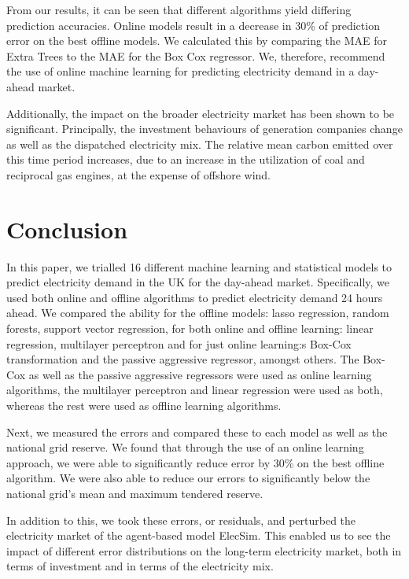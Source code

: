 \documentclass[final,3p,times,twocolumn,numbers]{elsarticle}
\begin{document}

From our results, it can be seen that different algorithms yield differing prediction accuracies. Online models result in a decrease in 30\% of prediction error on the best offline models. We calculated this by comparing the MAE for Extra Trees to the MAE for the Box Cox regressor. We, therefore, recommend the use of online machine learning for predicting electricity demand in a day-ahead market.

Additionally, the impact on the broader electricity market has been shown to be significant. Principally, the investment behaviours of generation companies change as well as the dispatched electricity mix. The relative mean carbon emitted over this time period increases, due to an increase in the utilization of coal and reciprocal gas engines, at the expense of offshore wind.


\section{Conclusion}
\label{sec:conclusion}

In this paper, we trialled 16 different machine learning and statistical models to predict electricity demand in the UK for the day-ahead market. Specifically, we used both online and offline algorithms to predict electricity demand 24 hours ahead. We compared the ability for the offline models: lasso regression, random forests, support vector regression, for both online and offline learning: linear regression, multilayer perceptron and for just online learning:s Box-Cox transformation and the passive aggressive regressor, amongst others. The Box-Cox as well as the passive aggressive regressors were used as online learning algorithms, the multilayer perceptron and linear regression were used as both, whereas the rest were used as offline learning algorithms.

Next, we measured the errors and compared these to each model as well as the national grid reserve. We found that through the use of an online learning approach, we were able to significantly reduce error by 30\% on the best offline algorithm.  We were also able to reduce our errors to significantly below the national grid's mean and maximum tendered reserve.

In addition to this, we took these errors, or residuals, and perturbed the electricity market of the agent-based model ElecSim. This enabled us to see the impact of different error distributions on the long-term electricity market, both in terms of investment and in terms of the electricity mix.
\end{document}
